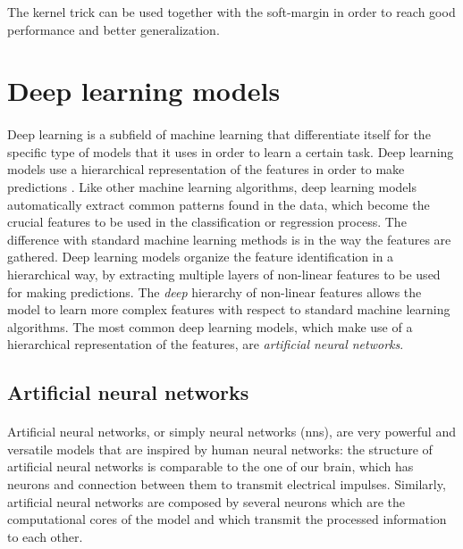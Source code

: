 The kernel trick can be used together with the soft-margin in order to reach good performance and better generalization.


\section{Deep learning models} \label{sec: dl_models}
\paragraph{} Deep learning is a subfield of machine learning that differentiate itself for the specific type of models that it uses in order to learn a certain task. Deep learning models use a hierarchical representation of the features in order to make predictions \cite{Nvidia:dl}. Like other machine learning algorithms, deep learning models automatically extract common patterns found in the data, which become the crucial features to be used in the classification or regression process. The difference with standard machine learning methods is in the way the features are gathered. Deep learning models organize the feature identification in a hierarchical way, by extracting multiple layers of non-linear features to be used for making predictions. The \textit{deep} hierarchy of non-linear features allows the model to learn more complex features with respect to standard machine learning algorithms. The most common deep learning models, which make use of a hierarchical representation of the features, are \textit{artificial neural networks}.


\subsection{Artificial neural networks}
\paragraph{} Artificial neural networks, or simply neural networks (\acsp{nn}), are very powerful and versatile models that are inspired by human neural networks: the structure of artificial neural networks is comparable to the one of our brain, which has neurons and connection between them to transmit electrical impulses. Similarly, artificial neural networks are composed by several neurons which are the computational cores of the model and which transmit the processed information to each other.

